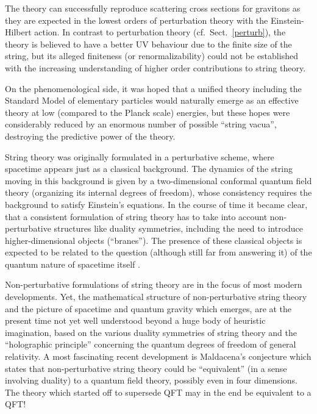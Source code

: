 \documentclass[multphys,vecphys]{svmult}
\begin{document}
The theory can successfully reproduce scattering
cross sections for gravitons as they are expected
in the lowest orders of perturbation 
theory with the Einstein-Hilbert action. In contrast to perturbation
theory (cf.\ Sect.~\ref{perturb}), the theory is believed to have 
a better UV behaviour due to the
finite size of the string, but its alleged finiteness (or
renormalizability) could not be established 
with the increasing understanding of higher order contributions to
string theory.   

On the phenomenological side, it was hoped that a unified theory
including the Standard Model of elementary particles would naturally
emerge as an effective theory at low (compared
to the Planck scale) energies, but these hopes
were considerably reduced by an enormous number of possible ``string
vacua'', destroying the predictive power of the theory.

String theory was originally formulated in a
perturbative scheme, where spacetime
appears just as a classical background. The 
dynamics of the string moving in this background is given by a
two-dimensional conformal quantum field 
theory (organizing its internal degrees of freedom), whose consistency
requires the background to satisfy Einstein's equations. In the course
of time it became clear, that a consistent formulation of string
theory has to take into account non-perturbative structures like
duality symmetries, including the need to introduce higher-dimensional
objects (``branes''). The presence of these classical objects is
expected to be related to the question (although still far from
answering it) of the quantum nature of spacetime itself \cite{Hor}.    

Non-perturbative formulations of
string theory are in the focus of most modern developments. Yet, the
mathematical structure of non-perturbative string theory and the
picture of spacetime and quantum gravity which
emerges, are at the present time not yet well understood beyond a huge
body of heuristic imagination, based on the various duality symmetries
of string theory and the ``holographic principle'' concerning the quantum degrees of freedom of general 
relativity. A most fascinating recent development is Maldacena's
conjecture which states that non-perturbative string theory could be
``equivalent'' (in a sense involving duality) to a quantum field
theory, possibly even in four dimensions. The theory which started off
to supersede QFT may in the end be equivalent to a QFT!  
\end{document}
